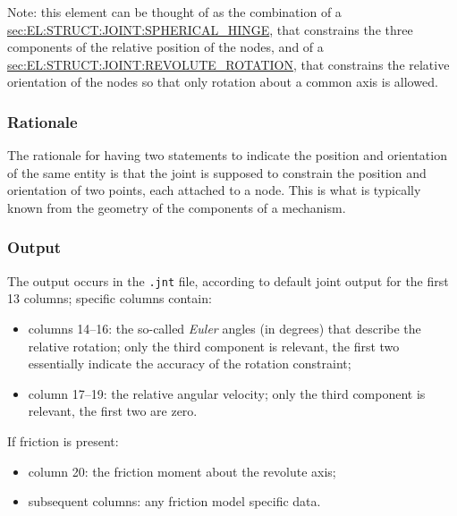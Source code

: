 Note: this element can be thought of as the combination of a 
\hyperref{\kw{spherical hinge}}{\kw{spherical hinge} (see Section~}{)}{sec:EL:STRUCT:JOINT:SPHERICAL_HINGE},
that constrains the three components of the relative position
of the nodes, and of a
\hyperref{\kw{revolute rotation}}{\kw{revolute rotation} (see Section~}{)}{sec:EL:STRUCT:JOINT:REVOLUTE_ROTATION},
that constrains the relative orientation of the nodes so that only rotation
about a common axis is allowed.

\subsubsection{Rationale}
The rationale for having two statements to indicate the position
and orientation of the same entity is that the joint is supposed
to constrain the position and orientation of two points,
each attached to a node.
This is what is typically known from the geometry of the components
of a mechanism.

\subsubsection{Output}
The output occurs in the \texttt{.jnt} file, according to default joint output
for the first 13 columns; specific columns contain:
\begin{itemize}
\item columns 14--16: the so-called \emph{Euler} angles (in degrees)
	that describe the relative rotation; only the third component
	is relevant, the first two essentially indicate the accuracy
	of the rotation constraint;
\item column 17--19: the relative angular velocity; only the third component
	is relevant, the first two are zero.
\end{itemize}
If friction is present:
\begin{itemize}
\item column 20: the friction moment about the revolute axis;
\item subsequent columns: any friction model specific data.
\end{itemize}

